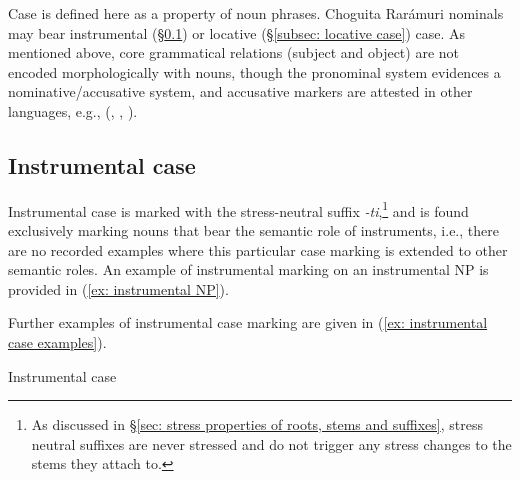 Case is defined here as a property of noun phrases. Choguita Rarámuri nominals may bear instrumental (§\ref{subsec: instrumental case}) or locative (§\ref{subsec: locative case}) case. As mentioned above, core grammatical relations (subject and object) are not encoded morphologically with nouns, though the pronominal system evidences a nominative/accusative system, and accusative markers are attested in other  languages, e.g.,  (\citealt{lindenfeld1973yaqui}, \citealt{escalante1990setting}, \citealt{dedrick1999sonora}).

\subsection{Instrumental case}
\label{subsec: instrumental case}

Instrumental case is marked with the stress-neutral suffix \textit{{}-ti},\footnote{As discussed in §\ref{sec: stress properties of roots, stems and suffixes}, stress neutral suffixes are never stressed and do not trigger any stress changes to the stems they attach to.} and is found exclusively marking nouns that bear the semantic role of instruments, i.e., there are no recorded examples where this particular case marking is extended to other semantic roles. An example of instrumental marking on an instrumental NP is provided in (\ref{ex: instrumental NP}).

\ea\label{ex: instrumental NP}

    \z
\z


Further examples of instrumental case marking are given in (\ref{ex: instrumental case examples}).

\pagebreak

\ea\label{ex: instrumental case examples}
{Instrumental case}

